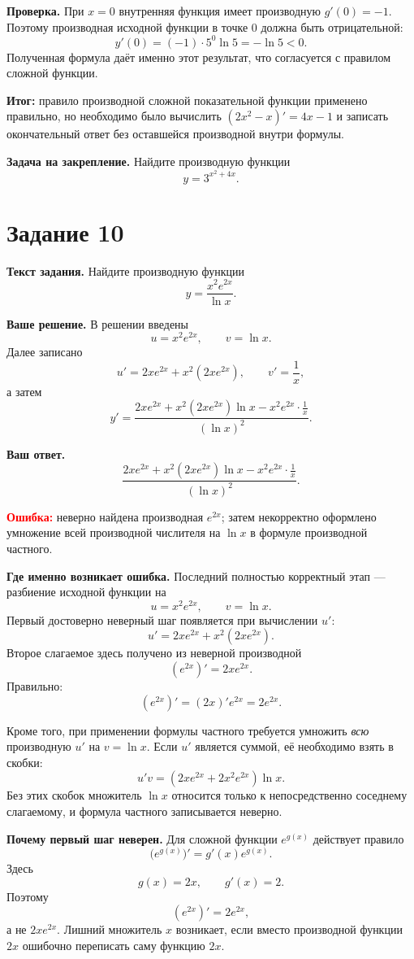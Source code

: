 \documentclass[12pt,a4paper]{article}
\begin{document}
\textbf{Проверка.}
При $x=0$ внутренняя функция имеет производную $g'(0)=-1$. Поэтому производная исходной функции в точке $0$ должна быть отрицательной:
\[
y'(0)=(-1)\cdot 5^0\ln 5=-\ln 5<0.
\]
Полученная формула даёт именно этот результат, что согласуется с правилом сложной функции.

\textcolor{teal!60!black}{\textbf{Итог:}}
правило производной сложной показательной функции применено правильно, но необходимо было вычислить $(2x^2-x)'=4x-1$ и записать окончательный ответ без оставшейся производной внутри формулы.

\textbf{Задача на закрепление.}
Найдите производную функции
\[
y=3^{x^2+4x}.
\]

\newpage
{}\label{task:10}
\section*{Задание 10}

\textbf{Текст задания.}
Найдите производную функции
\[
y=\frac{x^2e^{2x}}{\ln x}.
\]

\textbf{Ваше решение.}
В решении введены
\[
u=x^2e^{2x},\qquad v=\ln x.
\]
Далее записано
\[
u'=2xe^{2x}+x^2(2xe^{2x}),
\qquad
v'=\frac1x,
\]
а затем
\[
y'=\frac{2xe^{2x}+x^2(2xe^{2x})\ln x-x^2e^{2x}\cdot\frac1x}{(\ln x)^2}.
\]

\textbf{Ваш ответ.}
\[
\frac{2xe^{2x}+x^2(2xe^{2x})\ln x-x^2e^{2x}\cdot\frac1x}{(\ln x)^2}.
\]

\textcolor{red}{\textbf{Ошибка:}} неверно найдена производная $e^{2x}$; затем некорректно оформлено умножение всей производной числителя на $\ln x$ в формуле производной частного.

\textbf{Где именно возникает ошибка.}
Последний полностью корректный этап --- разбиение исходной функции на
\[
u=x^2e^{2x},\qquad v=\ln x.
\]
Первый достоверно неверный шаг появляется при вычислении $u'$:
\[
u'=2xe^{2x}+x^2(2xe^{2x}).
\]
Второе слагаемое здесь получено из неверной производной
\[
(e^{2x})'=2xe^{2x}.
\]
Правильно:
\[
(e^{2x})'=(2x)'e^{2x}=2e^{2x}.
\]

Кроме того, при применении формулы частного требуется умножить \emph{всю} производную $u'$ на $v=\ln x$. Если $u'$ является суммой, её необходимо взять в скобки:
\[
u'v=(2xe^{2x}+2x^2e^{2x})\ln x.
\]
Без этих скобок множитель $\ln x$ относится только к непосредственно соседнему слагаемому, и формула частного записывается неверно.

\textbf{Почему первый шаг неверен.}
Для сложной функции $e^{g(x)}$ действует правило
\[
\bigl(e^{g(x)}\bigr)'=g'(x)e^{g(x)}.
\]
Здесь
\[
g(x)=2x,
\qquad
 g'(x)=2.
\]
Поэтому
\[
(e^{2x})'=2e^{2x},
\]
а не $2xe^{2x}$. Лишний множитель $x$ возникает, если вместо производной функции $2x$ ошибочно переписать саму функцию $2x$.
\end{document}
